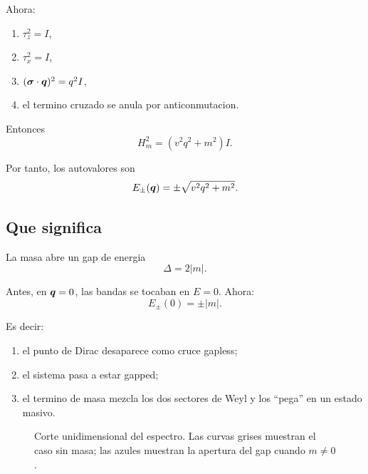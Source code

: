Ahora:

\begin{enumerate}[leftmargin=*]
  \item \(\tau_z^2=I\),
  \item \(\tau_x^2=I\),
  \item \((\bm{\sigma}\cdot\bm{q})^2=q^2 I\),
  \item el termino cruzado se anula por anticonmutacion.
\end{enumerate}

Entonces
\begin{equation}
H_m^2=(v^2 q^2 + m^2)I.
\end{equation}

Por tanto, los autovalores son
\begin{equation}
E_\pm(\bm{q})=\pm \sqrt{v^2 q^2 + m^2}.
\label{c13:eq:mass-spectrum}
\end{equation}

\subsection{Que significa}

La masa abre un gap de energia
\begin{equation}
\Delta = 2|m|.
\end{equation}

Antes, en \(\bm{q}=0\), las bandas se tocaban en \(E=0\). Ahora:
\begin{equation}
E_\pm(0)=\pm |m|.
\end{equation}

Es decir:

\begin{enumerate}[leftmargin=*]
  \item el punto de Dirac desaparece como cruce gapless;
  \item el sistema pasa a estar gapped;
  \item el termino de masa mezcla los dos sectores de Weyl y los ``pega'' en un estado masivo.
\end{enumerate}

\begin{figure}[ht]
\centering
{}
\caption{Corte unidimensional del espectro. Las curvas grises muestran el caso sin masa; las azules muestran la apertura del gap cuando \(m\neq 0\).}
\label{c13:fig:mass-gap}
\end{figure}

